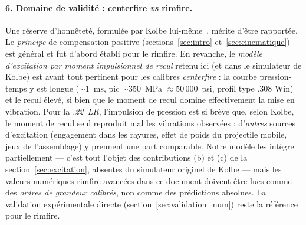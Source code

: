 \documentclass[12pt,a4paper]{article}
\begin{document}
	\paragraph{6. Domaine de validité : centerfire \emph{vs} rimfire.} Une réserve d'honnêteté, formulée par Kolbe lui-même~\cite{KolbeSim}, mérite d'être rapportée. Le \emph{principe} de compensation positive (sections~\ref{sec:intro} et~\ref{sec:cinematique}) est général et fut d'abord établi pour le rimfire. En revanche, le \emph{modèle d'excitation par moment impulsionnel de recul} retenu ici (et dans le simulateur de Kolbe) est avant tout pertinent pour les calibres \emph{centerfire} : la courbe pression-temps y est longue ($\sim 1$~ms, pic $\sim 350$~MPa $\approx 50\,000$~psi, profil type .308 Win) et le recul élevé, si bien que le moment de recul domine effectivement la mise en vibration. Pour la \emph{.22~LR}, l'impulsion de pression est si brève que, selon Kolbe, le moment de recul seul reproduit mal les vibrations observées : d'\emph{autres} sources d'excitation (engagement dans les rayures, effet de poids du projectile mobile, jeux de l'assemblage) y prennent une part comparable. Notre modèle les intègre partiellement — c'est tout l'objet des contributions (b) et (c) de la section~\ref{sec:excitation}, absentes du simulateur originel de Kolbe — mais les valeurs numériques rimfire avancées dans ce document doivent être lues comme des \emph{ordres de grandeur calibrés}, non comme des prédictions absolues. La validation expérimentale directe (section~\ref{sec:validation_num}) reste la référence pour le rimfire.
\end{document}
